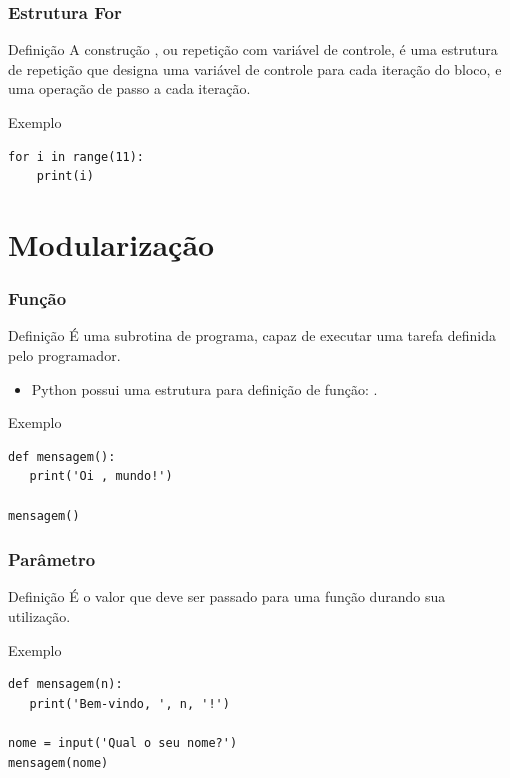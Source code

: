 \documentclass[aspectratio=169]{beamer} %
\begin{document}
\begin{frame}[fragile]
\frametitle{Estrutura For}

\begin{block}{Definição}
A construção , ou repetição com variável de controle, é uma estrutura de repetição que designa uma variável de controle para cada iteração do bloco, e uma operação de passo a cada iteração.
\end{block}\vfill

\begin{exampleblock}{Exemplo}
	\begin{lstlisting}
for i in range(11):
    print(i)
	\end{lstlisting}
\end{exampleblock}
\end{frame}

\section{Modulariza\c cão}

\begin{frame}[fragile]
\frametitle{Função}

\begin{block}{Definição}
É uma subrotina de programa, capaz de executar uma tarefa definida pelo programador.
\end{block} \vfill

\begin{itemize}
	\item Python possui uma estrutura para definição de função: .
\end{itemize}

\begin{exampleblock}{Exemplo}
	\begin{lstlisting}
def mensagem():
   print('Oi , mundo!')
		
mensagem()
	\end{lstlisting}
\end{exampleblock}
\end{frame}

\begin{frame}[fragile]
	\frametitle{Parâmetro}
	
	\begin{block}{Definição}
		É o valor que deve ser passado para uma função durando sua utilização.
	\end{block} \vfill
	
	\begin{exampleblock}{Exemplo}
		\begin{lstlisting}
def mensagem(n):
   print('Bem-vindo, ', n, '!')
			
nome = input('Qual o seu nome?')
mensagem(nome)
		\end{lstlisting}
	\end{exampleblock}
\end{frame}
\end{document}
